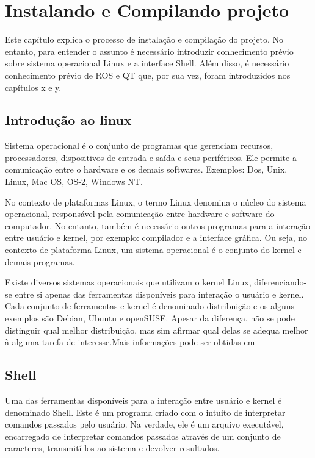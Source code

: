 \chapter{Instalando e Compilando projeto}

Este capítulo explica o processo de instalação e compilação do projeto. No entanto, para entender o assunto é necessário introduzir conhecimento prévio sobre sistema operacional Linux e a interface Shell. Além disso, é necessário conhecimento prévio de ROS e QT que, por sua vez, foram introduzidos nos capítulos x e y. 

\section{Introdução ao linux}

Sistema operacional é o conjunto de programas que gerenciam recursos, processadores, dispositivos de entrada e saída e seus periféricos. Ele permite a comunicação entre o hardware e os demais softwares. Exemplos: Dos, Unix, Linux, Mac OS, OS-2, Windows NT. \cite{SisOp}

No contexto de plataformas Linux, o termo Linux denomina o núcleo do sistema operacional, responsável pela comunicação entre hardware e software do computador. No entanto, também é necessário outros programas para a interação entre usuário e kernel, por exemplo: compilador e a interface gráfica. Ou seja, no contexto de plataforma Linux, um sistema operacional é o conjunto do kernel e demais programas. 

Existe diversos sistemas operacionais que utilizam o kernel Linux, diferenciando-se entre si apenas das ferramentas disponíveis para interação o usuário e kernel. Cada conjunto de ferramentas e kernel é denominado distribuição e os alguns exemplos são Debian, Ubuntu e openSUSE. Apesar da diferença, não se pode distinguir qual melhor distribuição, mas sim afirmar qual delas se adequa melhor à alguma tarefa de interesse.Mais informações pode ser obtidas em \cite{Linux}

\section{Shell}

Uma das ferramentas disponíveis para a interação entre usuário e kernel é denominado Shell. Este é um programa criado com o intuito de interpretar comandos passados pelo usuário. Na verdade,  ele é um arquivo executável, encarregado de interpretar comandos passados através de um conjunto de caracteres, transmití-los ao sistema e devolver resultados.
 
